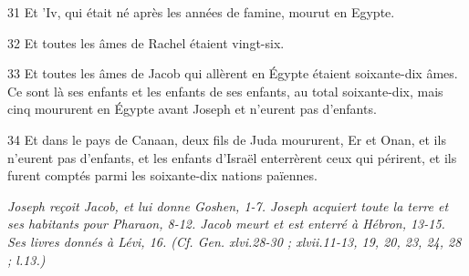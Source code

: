 \par 31 Et 'Iv, qui était né après les années de famine, mourut en Egypte.
\par 32 Et toutes les âmes de Rachel étaient vingt-six.
\par 33 Et toutes les âmes de Jacob qui allèrent en Égypte étaient soixante-dix âmes. Ce sont là ses enfants et les enfants de ses enfants, au total soixante-dix, mais cinq moururent en Égypte avant Joseph et n'eurent pas d'enfants.
\par 34 Et dans le pays de Canaan, deux fils de Juda moururent, Er et Onan, et ils n'eurent pas d'enfants, et les enfants d'Israël enterrèrent ceux qui périrent, et ils furent comptés parmi les soixante-dix nations païennes.


\par \textit{Joseph reçoit Jacob, et lui donne Goshen, 1-7. Joseph acquiert toute la terre et ses habitants pour Pharaon, 8-12. Jacob meurt et est enterré à Hébron, 13-15. Ses livres donnés à Lévi, 16. (Cf. Gen. xlvi.28-30 ; xlvii.11-13, 19, 20, 23, 24, 28 ; l.13.)}

